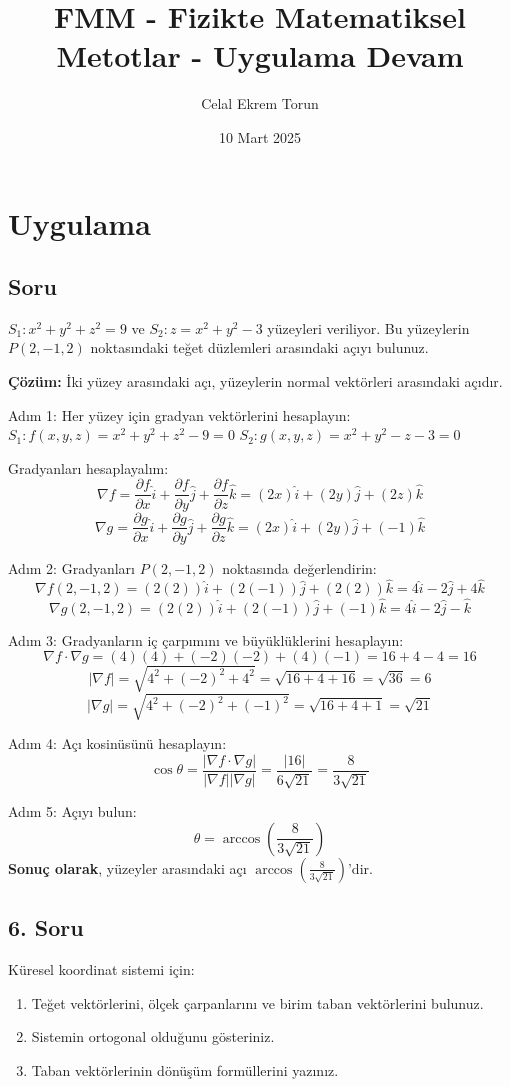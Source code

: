 \documentclass[11pt,letterpaper]{article}
\title{FMM - Fizikte Matematiksel Metotlar - Uygulama Devam}
\author{Celal Ekrem Torun}
\date{10 Mart 2025}
\begin{document}
\section{Uygulama}

\subsection*{Soru}
$S_1: x^2 + y^2 + z^2 = 9$ ve $S_2: z = x^2 + y^2 - 3$ yüzeyleri veriliyor. Bu yüzeylerin $P(2, -1, 2)$ noktasındaki teğet düzlemleri arasındaki açıyı bulunuz.

\textbf{Çözüm:}
İki yüzey arasındaki açı, yüzeylerin normal vektörleri arasındaki açıdır.

Adım 1: Her yüzey için gradyan vektörlerini hesaplayın:
$S_1: f(x, y, z) = x^2 + y^2 + z^2 - 9 = 0$
$S_2: g(x, y, z) = x^2 + y^2 - z - 3 = 0$

Gradyanları hesaplayalım:
\[
\nabla f = \frac{\partial f}{\partial x}\hat{i} + \frac{\partial f}{\partial y}\hat{j} + \frac{\partial f}{\partial z}\hat{k} = (2x)\hat{i} + (2y)\hat{j} + (2z)\hat{k}
\]
\[
\nabla g = \frac{\partial g}{\partial x}\hat{i} + \frac{\partial g}{\partial y}\hat{j} + \frac{\partial g}{\partial z}\hat{k} = (2x)\hat{i} + (2y)\hat{j} + (-1)\hat{k}
\]

Adım 2: Gradyanları $P(2, -1, 2)$ noktasında değerlendirin:
\[
\nabla f(2, -1, 2) = (2(2))\hat{i} + (2(-1))\hat{j} + (2(2))\hat{k} = 4\hat{i} - 2\hat{j} + 4\hat{k}
\]
\[
\nabla g(2, -1, 2) = (2(2))\hat{i} + (2(-1))\hat{j} + (-1)\hat{k} = 4\hat{i} - 2\hat{j} - \hat{k}
\]

Adım 3: Gradyanların iç çarpımını ve büyüklüklerini hesaplayın:
\[
\nabla f \cdot \nabla g = (4)(4) + (-2)(-2) + (4)(-1) = 16 + 4 - 4 = 16
\]
\[
|\nabla f| = \sqrt{4^2 + (-2)^2 + 4^2} = \sqrt{16 + 4 + 16} = \sqrt{36} = 6
\]
\[
|\nabla g| = \sqrt{4^2 + (-2)^2 + (-1)^2} = \sqrt{16 + 4 + 1} = \sqrt{21}
\]

Adım 4: Açı kosinüsünü hesaplayın:
\[
\cos{\theta} = \frac{|\nabla f \cdot \nabla g|}{|\nabla f| |\nabla g|} = \frac{|16|}{6 \sqrt{21}} = \frac{8}{3\sqrt{21}}
\]

Adım 5: Açıyı bulun:
\[
\theta = \arccos{\left(\frac{8}{3\sqrt{21}}\right)}
\]
\textbf{Sonuç olarak}, yüzeyler arasındaki açı $\arccos{\left(\frac{8}{3\sqrt{21}}\right)}$'dir.

\subsection*{6. Soru}
Küresel koordinat sistemi için:
\begin{enumerate}
    \item Teğet vektörlerini, ölçek çarpanlarını ve birim taban vektörlerini bulunuz.
    \item Sistemin ortogonal olduğunu gösteriniz.
    \item Taban vektörlerinin dönüşüm formüllerini yazınız.
\end{enumerate}
\end{document}
